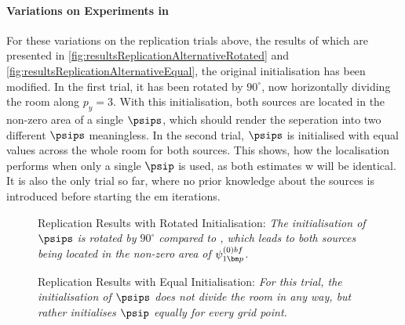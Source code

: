 \paragraph{Variations on Experiments in \citeauthor{Schwartz2014} \citeyearpar{Schwartz2014}}
For these variations on the replication trials above, the results of which are presented in \autoref{fig:resultsReplicationAlternativeRotated} and \autoref{fig:resultsReplicationAlternativeEqual}, the original initialisation has been modified. In the first trial, it has been rotated by $90^{\circ}$, now horizontally dividing the room along $p_y=3$. With this initialisation, both sources are located in the non-zero area of a single $\psips$, which should render the seperation into two different $\psips$ meaningless. In the second trial, $\psips$ is initialised with equal values across the whole room for both sources. This shows, how the localisation performs when only a single $\psip$ is used, as both estimates w will be identical. It is also the only trial so far, where no prior knowledge about the sources is introduced before starting the \gls{em} iterations.

\begin{figure}[!htbp]
\centering
    \iftoggle{quick}{%
		\texttt{[image: plots/schwartz2014-variation/s=2-sloc=schwartz2014-T60=0.7-prior=schwartz2014-unlucky-results]}
		}{%
			\setlength{\figurewidth}{\textwidth}
    
		}
	\caption[Replication Results with Rotated Initialisation]{Replication Results with Rotated Initialisation: \itshape The initialisation of $\psips$ is rotated by $90^{\circ}$ compared to \cite{Schwartz2014}, which leads to both sources being located in the non-zero area of $\psi_{1\bm p}^{\text(0)bf}$.}
	\label{fig:resultsReplicationAlternativeRotated}
\end{figure}

\begin{figure}[!htbp]
\centering
    \iftoggle{quick}{%
		\texttt{[image: plots/schwartz2014-variation/s=2-sloc=schwartz2014-T60=0.7-prior=equal-results]}
		}{%
			\setlength{\figurewidth}{\textwidth}
    
		}
	\caption[Replication Results with Equal Initialisation]{Replication Results with Equal Initialisation: \itshape For this trial, the initialisation of $\psips$ does not divide the room in any way, but rather initialises $\psip$ equally for every grid point.}
	\label{fig:resultsReplicationAlternativeEqual}
\end{figure}

